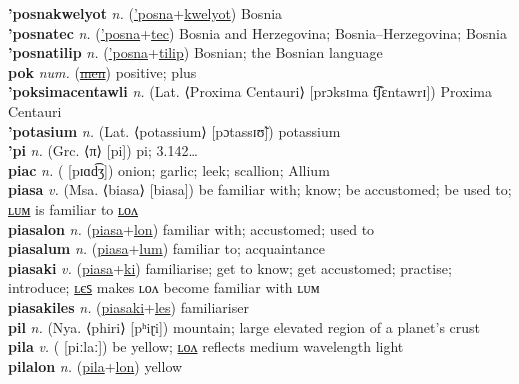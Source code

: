 \textbf{'posnakwelyot} \textit{n.} (\hyperref['posna]{'posna}+\hyperref[kwelyot]{kwelyot})
Bosnia \label{'posnakwelyot} \\
\textbf{'posnatec} \textit{n.} (\hyperref['posna]{'posna}+\hyperref[tec]{tec})
Bosnia and Herzegovina; Bosnia–Herzegovina; Bosnia \label{'posnatec} \\
\textbf{'posnatilip} \textit{n.} (\hyperref['posna]{'posna}+\hyperref[tilip]{tilip})
Bosnian; the Bosnian language \label{'posnatilip} \\
\textbf{pok} \textit{num.} (\hyperref[men]{\sout{men}})
positive; plus \label{pok} \\
\textbf{'poksimacentawli} \textit{n.} (Lat. ⟨Proxima Centauri⟩ [prɔksɪma t͡ʃɛntawrɪ])
Proxima Centauri \label{'poksimacentawli} \\
\textbf{'potasium} \textit{n.} (Lat. ⟨potassium⟩ [pɔtassɪʊ̃])
potassium \label{'potasium} \\
\textbf{'pi} \textit{n.} (Grc. ⟨π⟩ [pi])
pi; 3.142… \label{'pi} \\
\textbf{piac} \textit{n.} ( [pɪɑd͡ʒ])
onion; garlic; leek; scallion; Allium \label{piac} \\
\textbf{piasa} \textit{v.} (Msa. ⟨biasa⟩ [biasa])
be familiar with; know; be accustomed; be used to; \hyperref[piasalum]{ʟᴜᴍ} is familiar to \hyperref[piasalon]{ʟᴏᴧ} \label{piasa} \\
\textbf{piasalon} \textit{n.} (\hyperref[piasa]{piasa}+\hyperref[lon]{lon})
familiar with; accustomed; used to \label{piasalon} \\
\textbf{piasalum} \textit{n.} (\hyperref[piasa]{piasa}+\hyperref[lum]{lum})
familiar to; acquaintance \label{piasalum} \\
\textbf{piasaki} \textit{v.} (\hyperref[piasa]{piasa}+\hyperref[ki]{ki})
familiarise; get to know; get accustomed; practise; introduce; \hyperref[piasakiles]{ʟєꜱ} makes ʟᴏᴧ become familiar with ʟᴜᴍ \label{piasaki} \\
\textbf{piasakiles} \textit{n.} (\hyperref[piasaki]{piasaki}+\hyperref[les]{les})
familiariser \label{piasakiles} \\
\textbf{pil} \textit{n.} (Nya. ⟨phiri⟩ [pʰiɽi])
mountain; large elevated region of a planet’s crust \label{pil} \\
\textbf{pila} \textit{v.} ( [piːlaː])
be yellow; \hyperref[pilalon]{ʟᴏᴧ} reflects medium wavelength light \label{pila} \\
\textbf{pilalon} \textit{n.} (\hyperref[pila]{pila}+\hyperref[lon]{lon})
yellow \label{pilalon} \\
